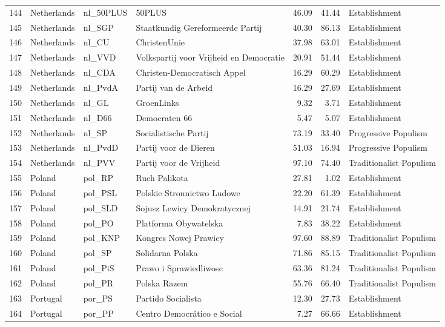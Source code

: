 \begin{longtable}[c]{@{\extracolsep{\fill}}rlllrrl}
		144 & Netherlands & nl\_50PLUS & 50PLUS & 46.09 & 41.44 & Establishment \\
		145 & Netherlands & nl\_SGP & Staatkundig Gereformeerde Partij & 40.30 & 86.13 & Establishment \\
		146 & Netherlands & nl\_CU & ChristenUnie & 37.98 & 63.01 & Establishment \\
		147 & Netherlands & nl\_VVD & Volkspartij voor Vrijheid en Democratie & 20.91 & 51.44 & Establishment \\
		148 & Netherlands & nl\_CDA & Christen-Democratisch Appel & 16.29 & 60.29 & Establishment \\
		149 & Netherlands & nl\_PvdA & Partij van de Arbeid & 16.29 & 27.69 & Establishment \\
		150 & Netherlands & nl\_GL & GroenLinks & 9.32 & 3.71 & Establishment \\
		151 & Netherlands & nl\_D66 & Democraten 66 & 5.47 & 5.07 & Establishment \\
		152 & Netherlands & nl\_SP & Socialistische Partij & 73.19 & 33.40 & Progressive Populism \\
		153 & Netherlands & nl\_PvdD & Partij voor de Dieren & 51.03 & 16.94 & Progressive Populism \\
		154 & Netherlands & nl\_PVV & Partij voor de Vrijheid & 97.10 & 74.40 & Traditionalist Populism \\
		155 & Poland & pol\_RP & Ruch Palikota & 27.81 & 1.02 & Establishment \\
		156 & Poland & pol\_PSL & Polskie Stronnictwo Ludowe & 22.20 & 61.39 & Establishment \\
		157 & Poland & pol\_SLD & Sojusz Lewicy Demokratycznej & 14.91 & 21.74 & Establishment \\
		158 & Poland & pol\_PO & Platforma Obywatelska & 7.83 & 38.22 & Establishment \\
		159 & Poland & pol\_KNP & Kongres Nowej Prawicy & 97.60 & 88.89 & Traditionalist Populism \\
		160 & Poland & pol\_SP & Solidarna Polska & 71.86 & 85.15 & Traditionalist Populism \\
		161 & Poland & pol\_PiS & Prawo i Sprawiedliwosc & 63.36 & 81.24 & Traditionalist Populism \\
		162 & Poland & pol\_PR & Polska Razem & 55.76 & 66.40 & Traditionalist Populism \\
		163 & Portugal & por\_PS & Partido Socialista & 12.30 & 27.73 & Establishment \\
		164 & Portugal & por\_PP & Centro Democrático e Social & 7.27 & 66.66 & Establishment \\

\end{longtable}
